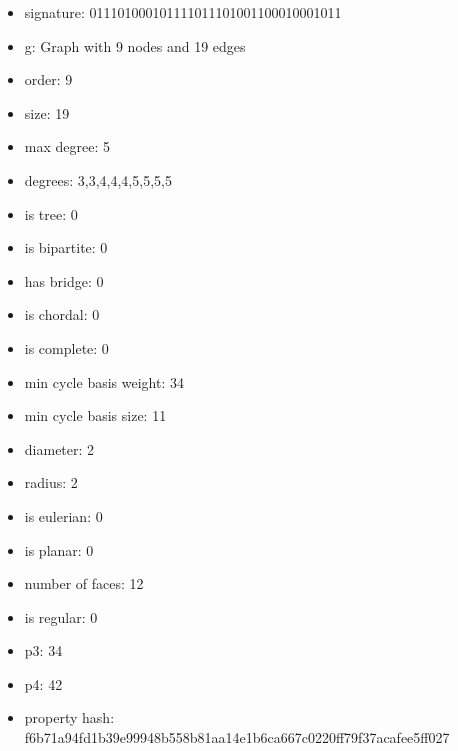 \newpage
\begin{figure}
\end{figure}
\begin{itemize}
\item signature: 011101000101111011101001100010001011
\item g: Graph with 9 nodes and 19 edges
\item order: 9
\item size: 19
\item max degree: 5
\item degrees: 3,3,4,4,4,5,5,5,5
\item is tree: 0
\item is bipartite: 0
\item has bridge: 0
\item is chordal: 0
\item is complete: 0
\item min cycle basis weight: 34
\item min cycle basis size: 11
\item diameter: 2
\item radius: 2
\item is eulerian: 0
\item is planar: 0
\item number of faces: 12
\item is regular: 0
\item p3: 34
\item p4: 42
\item property hash: f6b71a94fd1b39e99948b558b81aa14e1b6ca667c0220ff79f37acafee5ff027
\end{itemize}

